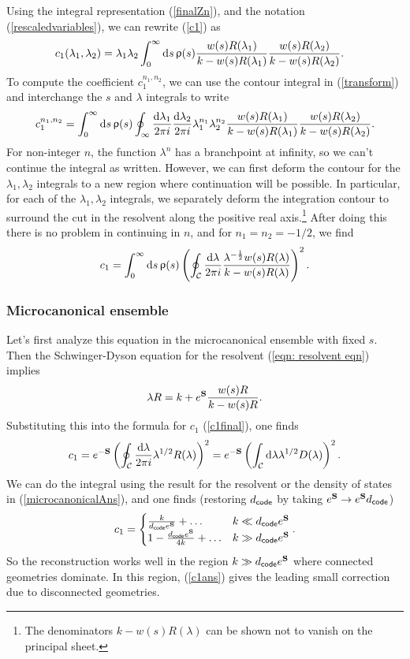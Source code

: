 \documentclass[12pt]{article}
\newcommand{\be}{\begin{equation}}
\newcommand{\ee}{\end{equation}}
\numberwithin{equation}{section}
\begin{document}
Using the integral representation (\ref{finalZn}), and the notation (\ref{rescaledvariables}), we can rewrite (\ref{c1}) as
\be
\begin{split}\label{c1first}
	c_1(\lambda_1,\lambda_2)&=\lambda_1\lambda_2\int_0^\infty \mathrm{d}s\,\uprho(s){w(s)R(\lambda_1) \over k- w(s)R(\lambda_1)}{w(s)R(\lambda_2)\over k-w(s)R(\lambda_2) }.
\end{split}
\ee
To compute the coefficient $c_1^{n_1,n_2}$, we can use the contour integral in (\ref{transform}) and interchange the $s$ and $\lambda$ integrals to write
\be
c_1^{n_1,n_2} = \int_0^\infty \mathrm{d}s\,\uprho(s)\oint_{\infty}\frac{\mathrm{d}\lambda_1}{2\pi i}\frac{\mathrm{d}\lambda_2}{2\pi i}\lambda_1^{n_1}\lambda_2^{n_2}{w(s)R(\lambda_1) \over k- w(s)R(\lambda_1)}{w(s)R(\lambda_2)\over k-w(s)R(\lambda_2) }.
\ee
For non-integer $n$, the function $\lambda^n$ has a branchpoint at infinity, so we can't continue the integral as written. However, we can first deform the contour for the $\lambda_1,\lambda_2$ integrals to a new region where continuation will be possible. In particular, for each of the $\lambda_1,\lambda_2$ integrals, we separately deform the integration contour to surround the cut in the resolvent along the positive real axis.\footnote{The denominators $k - w(s)R(\lambda)$ can be shown not to vanish on the principal sheet.} After doing this there is no problem in continuing in $n$, and for $n_1 = n_2 = -1/2$, we find
\be
c_1 = \int_0^\infty \mathrm{d}s\,\uprho(s)\left(\oint_{\mathcal{C}}\frac{\mathrm{d}\lambda}{2\pi i}{\lambda^{-\frac{1}{2}}w(s)R(\lambda) \over k- w(s)R(\lambda)}\right)^2.\label{c1final}
\ee


\subsubsection{Microcanonical ensemble}
Let's first analyze this equation in the microcanonical ensemble with fixed $s$. Then the Schwinger-Dyson equation for the resolvent (\ref{eqn: resolvent eqn}) implies
\be
\lambda R = k + e^{\bf{S}}\frac{w(s)R}{k - w(s)R}.
\ee
Substituting this into the formula for $c_1$ (\ref{c1final}), one finds
\be
c_1 = e^{-{\bf S}}\left(\oint_{\mathcal{C}}\frac{\mathrm{d}\lambda}{2\pi i}\lambda^{1/2}R(\lambda)\right)^2 = e^{-{\bf S}}\left(\int_{\mathcal{C}}\mathrm{d}\lambda\lambda^{1/2}D(\lambda)\right)^2.\label{c11}
\ee
We can do the integral using the result for the resolvent or the density of states in (\ref{microcanonicalAns}), and one finds (restoring $d_{\sf{code}}$ by taking $e^{\bf{S}}\to e^{\bf{S}}d_{\sf{code}}$)
\be
c_1 = \begin{cases}\frac{k}{d_{\sf{code}}e^{{\bf S}}} + \dots  & k \ll d_{\sf{code}}e^{\bf{S}} \\ 1 - \frac{d_{\sf{code}}e^{\bf S}}{4k} +\dots & k \gg d_{\sf{code}}e^{\bf{S}}\end{cases}.\label{c1ans}
\ee
So the reconstruction works well in the region $k \gg d_{\sf{code}}e^{\bf{S}}$ where connected geometries dominate. In this region, (\ref{c1ans}) gives the leading small correction due to disconnected geometries.
\end{document}
